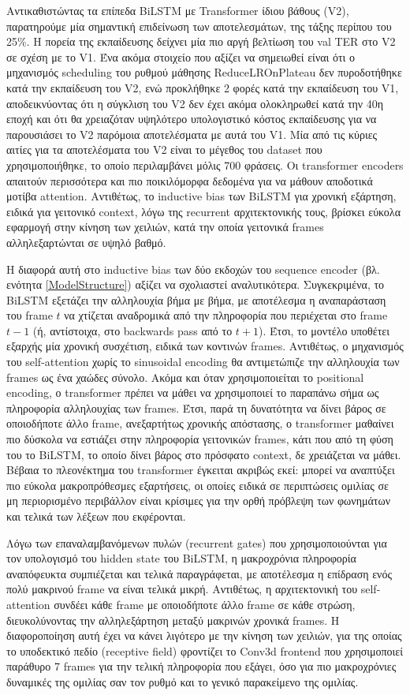 Αντικαθιστώντας τα επίπεδα BiLSTM με Transformer ίδιου βάθους (V2), παρατηρούμε μία σημαντική επιδείνωση των αποτελεσμάτων, της τάξης περίπου του 25\%. Η πορεία της εκπαίδευσης δείχνει μία πιο αργή βελτίωση του val TER στο V2 σε σχέση με το V1. Ένα ακόμα στοιχείο που αξίζει να σημειωθεί είναι ότι ο μηχανισμός scheduling του ρυθμού μάθησης ReduceLROnPlateau δεν πυροδοτήθηκε κατά την εκπαίδευση του V2, ενώ προκλήθηκε 2 φορές κατά την εκπαίδευση του V1, αποδεικνύοντας ότι η σύγκλιση του V2 δεν έχει ακόμα ολοκληρωθεί κατά την 40η εποχή και ότι θα χρειαζόταν υψηλότερο υπολογιστικό κόστος εκπαίδευσης για να παρουσιάσει το V2 παρόμοια αποτελέσματα με αυτά του V1. Μία από τις κύριες αιτίες για τα αποτελέσματα του V2 είναι το μέγεθος του dataset που χρησιμοποιήθηκε, το οποίο περιλαμβάνει μόλις 700 φράσεις. Οι transformer encoders απαιτούν περισσότερα και πιο ποικιλόμορφα δεδομένα για να μάθουν αποδοτικά μοτίβα attention. Αντιθέτως, το inductive bias των BiLSTM για χρονική εξάρτηση, ειδικά για γειτονικό context, λόγω της recurrent αρχιτεκτονικής τους, βρίσκει εύκολα εφαρμογή στην κίνηση των χειλιών, κατά την οποία γειτονικά frames αλληλεξαρτώνται σε υψηλό βαθμό.

Η διαφορά αυτή στο inductive bias των δύο εκδοχών του sequence encoder (βλ. ενότητα \ref{ModelStructure}) αξίζει να σχολιαστεί αναλυτικότερα. Συγκεκριμένα, το BiLSTM εξετάζει την αλληλουχία βήμα με βήμα, με αποτέλεσμα η αναπαράσταση του frame $t$ να χτίζεται αναδρομικά από την πληροφορία που περιέχεται στο frame $t-1$ (ή, αντίστοιχα, στο backwards pass από το $t+1$). Έτσι, το μοντέλο υποθέτει εξαρχής μία χρονική συσχέτιση, ειδικά των κοντινών frames. Αντιθέτως, ο μηχανισμός του self-attention χωρίς το sinusoidal encoding θα αντιμετώπιζε την αλληλουχία των frames ως ένα χαώδες σύνολο. Ακόμα και όταν χρησιμοποιείται το positional encoding, ο transformer πρέπει να μάθει να χρησιμοποιεί το παραπάνω σήμα ως πληροφορία αλληλουχίας των frames. Έτσι, παρά τη δυνατότητα να δίνει βάρος σε οποιοδήποτε άλλο frame, ανεξαρτήτως χρονικής απόστασης, ο transformer μαθαίνει πιο δύσκολα να εστιάζει στην πληροφορία γειτονικών frames, κάτι που από τη φύση του το BiLSTM, το οποίο δίνει βάρος στο πρόσφατο context, δε χρειάζεται να μάθει. Βέβαια το πλεονέκτημα του transformer έγκειται ακριβώς εκεί: μπορεί να αναπτύξει πιο εύκολα μακροπρόθεσμες εξαρτήσεις, οι οποίες ειδικά σε περιπτώσεις ομιλίας σε μη περιορισμένο περιβάλλον είναι κρίσιμες για την ορθή πρόβλεψη των φωνημάτων και τελικά των λέξεων που εκφέρονται.

Λόγω των επαναλαμβανόμενων πυλών (recurrent gates) που χρησιμοποιούνται για τον υπολογισμό του hidden state του BiLSTM, η μακροχρόνια πληροφορία αναπόφευκτα συμπιέζεται και τελικά παραγράφεται, με αποτέλεσμα η επίδραση ενός πολύ μακρινού frame να είναι τελικά μικρή. Αντιθέτως, η αρχιτεκτονική του self-attention συνδέει κάθε frame με οποιοδήποτε άλλο frame σε κάθε στρώση, διευκολύνοντας την αλληλεξάρτηση μεταξύ μακρινών χρονικά frames. Η διαφοροποίηση αυτή έχει να κάνει λιγότερο με την κίνηση των χειλιών, για της οποίας το υποδεκτικό πεδίο (receptive field) φροντίζει το Conv3d frontend που χρησιμοποιεί παράθυρο 7 frames για την τελική πληροφορία που εξάγει, όσο για πιο μακροχρόνιες δυναμικές της ομιλίας σαν τον ρυθμό και το γενικό παρακείμενο της ομιλίας.

